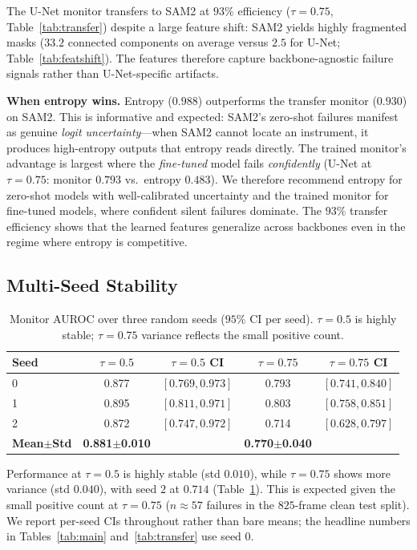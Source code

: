 \documentclass[letterpaper, 10 pt, conference]{ieeeconf}  %
\newcommand{\unet}{U-Net}
\begin{document}
The \unet{} monitor transfers to SAM2 at $93\%$ efficiency
($\tau = 0.75$, Table~\ref{tab:transfer}) despite a large feature shift:
SAM2 yields highly fragmented masks ($33.2$ connected components on average
versus $2.5$ for \unet{}; Table~\ref{tab:featshift}). The features therefore
capture backbone-agnostic failure signals rather than \unet{}-specific
artifacts.

\textbf{When entropy wins.} Entropy ($0.988$) outperforms the transfer
monitor ($0.930$) on SAM2. This is informative and expected: SAM2's zero-shot
failures manifest as genuine \emph{logit uncertainty}---when SAM2 cannot
locate an instrument, it produces high-entropy outputs that entropy reads
directly. The trained monitor's advantage is largest where the
\emph{fine-tuned} model fails \emph{confidently} (\unet{} at $\tau=0.75$:
monitor $0.793$ vs.\ entropy $0.483$). We therefore recommend entropy for
zero-shot models with well-calibrated uncertainty and the trained monitor for
fine-tuned models, where confident silent failures dominate. The $93\%$
transfer efficiency shows that the learned features generalize across
backbones even in the regime where entropy is competitive.

\subsection{Multi-Seed Stability}

\begin{table}[t]
\caption{Monitor AUROC over three random seeds ($95\%$ CI per seed). $\tau=0.5$ is highly stable; $\tau=0.75$ variance reflects the small positive count.}
\label{tab:seeds}
\centering
\footnotesize
\setlength{\tabcolsep}{3pt}
\begin{tabular}{lcccc}
\toprule
Seed & $\tau{=}0.5$ & $\tau{=}0.5$ CI & $\tau{=}0.75$ & $\tau{=}0.75$ CI \\
\midrule
0 & 0.877 & $[0.769, 0.973]$ & 0.793 & $[0.741, 0.840]$ \\
1 & 0.895 & $[0.811, 0.971]$ & 0.803 & $[0.758, 0.851]$ \\
2 & 0.872 & $[0.747, 0.972]$ & 0.714 & $[0.628, 0.797]$ \\
\midrule
\textbf{Mean$\pm$Std} & \textbf{0.881$\pm$0.010} & & \textbf{0.770$\pm$0.040} & \\
\bottomrule
\end{tabular}
\end{table}

Performance at $\tau = 0.5$ is highly stable (std $0.010$), while
$\tau = 0.75$ shows more variance (std $0.040$), with seed $2$ at $0.714$
(Table~\ref{tab:seeds}). This is expected given the small positive count at
$\tau = 0.75$ ($n \approx 57$ failures in the $825$-frame clean test split).
We report per-seed CIs throughout rather than bare means; the headline
numbers in Tables~\ref{tab:main} and~\ref{tab:transfer} use seed $0$.
\end{document}
